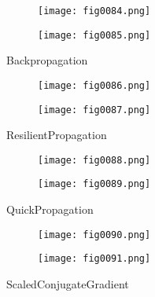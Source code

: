 %
%
%
\begin{figure}[H]
  \begin{subfigure}{0.49\textwidth}
  \texttt{[image: fig0084.png]}
  \label{fig0084}
  \end{subfigure}
  \begin{subfigure}{0.49\textwidth}
  \texttt{[image: fig0085.png]}
  \label{fig0085}
  \end{subfigure}
  \caption{Backpropagation}
\end{figure}

\begin{figure}[H]
  \begin{subfigure}{0.49\textwidth}
  \texttt{[image: fig0086.png]}
  \label{fig0086}
  \end{subfigure}
  \begin{subfigure}{0.49\textwidth}
  \texttt{[image: fig0087.png]}
  \label{fig0087}
  \end{subfigure}
  \caption{ResilientPropagation}
\end{figure}

\begin{figure}[H]
  \begin{subfigure}{0.49\textwidth}
  \texttt{[image: fig0088.png]}
  \label{fig0088}
  \end{subfigure}
  \begin{subfigure}{0.49\textwidth}
  \texttt{[image: fig0089.png]}
  \label{fig0089}
  \end{subfigure}
  \caption{QuickPropagation}
\end{figure}

\begin{figure}[H]
  \begin{subfigure}{0.49\textwidth}
  \texttt{[image: fig0090.png]}
  \label{fig0090}
  \end{subfigure}
  \begin{subfigure}{0.49\textwidth}
  \texttt{[image: fig0091.png]}
  \label{fig0091}
  \end{subfigure}
  \caption{ScaledConjugateGradient}
\end{figure}

